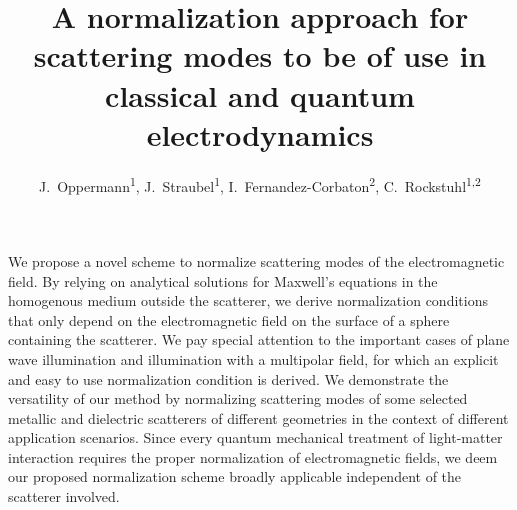 \documentclass[10pt,letterpaper]{article}
\begin{document}
\title{A normalization approach for scattering modes to be of use in classical and quantum electrodynamics}


\author{J.~Oppermann\textsuperscript{1}, J.~Straubel\textsuperscript{1}, I.~Fernandez-Corbaton\textsuperscript{2}, C.~Rockstuhl\textsuperscript{1,2}}

\address{\textsuperscript{1}Institute of Theoretical Solid State Physics, Karlsruhe Institute of Technology, Wolfgang-Gaede-Str.~1, D-76131 Karlsruhe, Germany}

\address{\textsuperscript{2}Institute of Nanotechnology, Karlsruhe Institute of Technology, Hermann-von-Helmholtz-Platz~1, D-76021 Eggenstein-Leopoldshafen, Germany}




\begin{abstract*}
We propose a novel scheme to normalize scattering modes of the electromagnetic field. By relying on analytical solutions for Maxwell's equations in the homogenous medium outside the scatterer, we derive normalization conditions that only depend on the electromagnetic field on the surface of a sphere containing the scatterer. We pay special attention to the important cases of plane wave illumination and illumination with a multipolar field, for which an explicit and easy to use normalization condition is derived. We demonstrate the versatility of our method by normalizing scattering modes of some selected metallic and dielectric scatterers of different geometries in the context of different application scenarios. Since every quantum mechanical treatment of light-matter interaction requires the proper normalization of electromagnetic fields, we deem our proposed normalization scheme broadly applicable independent of the scatterer involved.
\vspace{1mm}
\end{abstract*}
\end{document}
